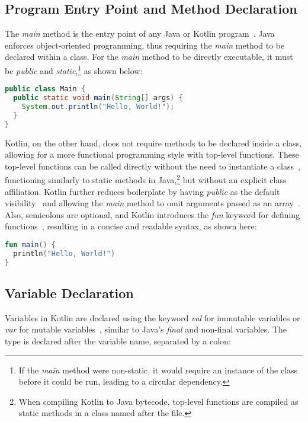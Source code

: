 \documentclass[a4paper,11pt]{article}
\begin{document}
\subsection{Program Entry Point and Method Declaration}
The \textit{main} method is the entry point of any Java or Kotlin program~\cite{program-entry-point}. Java enforces object-oriented programming, thus requiring the \textit{main} method to be declared within a class. For the \textit{main} method to be directly executable, it must be \textit{public} and \textit{static},\footnote{If the \textit{main} method were non-static, it would require an instance of the class before it could be run, leading to a circular dependency.} as shown below:

\begin{lstlisting}[language=Java, title={Java main method}]
public class Main {
  public static void main(String[] args) {
    System.out.println("Hello, World!");
  }
}
\end{lstlisting}

Kotlin, on the other hand, does not require methods to be declared inside a class, allowing for a more functional programming style with top-level functions. These top-level functions can be called directly without the need to instantiate a class~\cite{kotlin-functions-scope}, functioning similarly to static methods in Java,\footnote{When compiling Kotlin to Java bytecode, top-level functions are compiled as static methods in a class named after the file.} but without an explicit class affiliation. Kotlin further reduces boilerplate by having \textit{public} as the default visibility~\cite{visibility-modifiers} and allowing the \textit{main} method to omit arguments passed as an array~\cite{program-entry-point}. Also, semicolons are optional, and Kotlin introduces the \textit{fun} keyword for defining functions~\cite{functions}, resulting in a concise and readable syntax, as shown here:

\begin{lstlisting}[language=Kotlin, title={Kotlin main method}]
fun main() {
  println("Hello, World!")
}
\end{lstlisting}

\subsection{Variable Declaration}
Variables in Kotlin are declared using the keyword \textit{val} for immutable variables or \textit{var} for mutable variables~\cite{variables}, similar to Java's \textit{final} and non-final variables. The type is declared after the variable name, separated by a colon:
\end{document}
